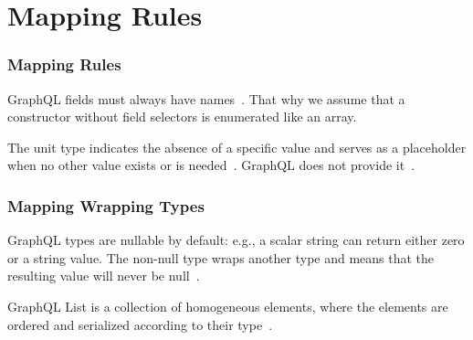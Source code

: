 


\section{Mapping Rules}

\begin{frame}\frametitle{Mapping Rules}

\footnotesize
\begin{itemize}

   GraphQL fields must always have names~\cite{gql-spec}. 
  That why we assume that a constructor without field selectors is enumerated like an array.
  

   The unit type indicates the absence of a specific value and serves as a placeholder when no other value exists or is needed~\cite{fsharp-unit}. GraphQL does not provide it~\cite{gql-spec}. 


\end{itemize}
\end{frame}

\begin{frame}\frametitle{Mapping Wrapping Types}

\begin{itemize}

   GraphQL types are nullable by default: e.g., a scalar string can return either zero or a string value. The non-null type wraps another type and means that the resulting value will never be null~\cite{gql-spec}.

   GraphQL List is a collection of homogeneous elements, where the elements are ordered and serialized according to their type~\cite{gql-spec}. 

\end{itemize}

\end{frame}

